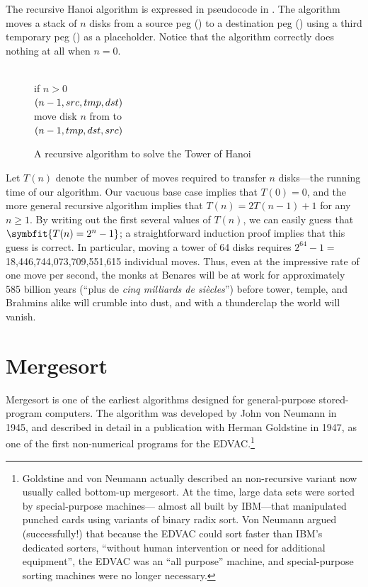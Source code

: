 The recursive Hanoi algorithm is expressed in pseudocode in . The algorithm moves a stack of $n$ disks from a source peg () to a destination peg () using a third temporary peg () as a placeholder. Notice that the algorithm correctly does nothing at all when $n = 0$.

\begin{figure}[ht]
\centering
\begin{pseudocode}
\\
if $n > 0$\\
\Indent {}$(n-1, src, tmp, dst)$ \\
\Indent move disk $n$ from  to \\
\Indent {}$(n-1, tmp, dst, src)$ 
\end{pseudocode}
\caption{A recursive algorithm to solve the Tower of Hanoi}
\label{fig:1.4}
\end{figure}
Let $T(n)$ denote the number of moves required to transfer $n$ disks—the running time of our algorithm. Our vacuous base case implies that $T(0) = 0$, and the more general recursive algorithm implies that $T(n) = 2T(n-1) + 1$ for any $n \ge 1$. By writing out the first several values of $T(n)$, we can easily guess that $\symbfit{T(n) = 2^n - 1}$; a straightforward induction proof implies that this guess is correct. In particular, moving a tower of 64 disks requires $2^{64} - 1 = {}$18,446,744,073,709,551,615 individual moves. Thus, even at the impressive rate of one move per second, the monks at Benares will be at work for approximately 585 billion years (“plus de \emph{cinq milliards de siècles}”) before tower, temple, and Brahmins alike will crumble into dust, and with a thunderclap the world will vanish.

\section{Mergesort}
\label{sec:1.4}

Mergesort is one of the earliest algorithms designed for general-purpose stored-program computers. The algorithm was developed by John von Neumann in 1945, and described in detail in a publication with Herman Goldstine in 1947, as one of the first non-numerical programs for the EDVAC.\footnote{Goldstine and von Neumann actually described an non-recursive variant now usually called bottom-up mergesort. At the time, large data sets were sorted by special-purpose machines— almost all built by IBM—that manipulated punched cards using variants of binary radix sort. Von Neumann argued (successfully!) that because the EDVAC could sort faster than IBM’s dedicated sorters, “without human intervention or need for additional equipment”, the EDVAC was an “all purpose” machine, and special-purpose sorting machines were no longer necessary.}

